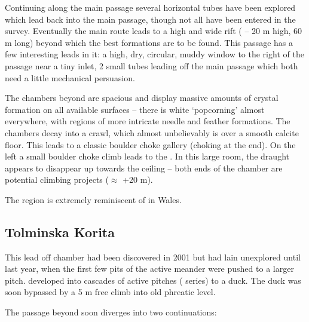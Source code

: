 Continuing along the main  passage several horizontal tubes have been explored which lead back into the main passage, though not all have
been entered in the survey. Eventually the main route leads to a high and wide rift ( -- 20 m high, 60 m long) beyond
which the best formations are to be found. This passage has a few interesting leads in it: a high, dry, circular, muddy window to the right of the passage near a tiny inlet, 2 small tubes leading off the main passage which both need a little mechanical persuasion.

The chambers beyond  are spacious and display massive amounts of crystal formation on all available surfaces -- there is
white `popcorning' almost everywhere, with regions of more intricate needle and feather formations. The chambers decay into a crawl, which almost unbelievably is over a smooth calcite floor. This leads to a classic boulder choke gallery (choking at the end). On the left a small boulder choke climb leads to the . In this large room, the draught appears to disappear up towards the ceiling -- both ends of
the chamber are potential climbing projects ($\approx$ +20 m).

The region is extremely reminiscent of  in Wales.


\subsection{Tolminska Korita}

This lead off  chamber had been discovered in 2001 but had lain unexplored until last year, when the first few pits of the active meander were pushed to a larger pitch.  developed into cascades of active pitches ( series) to a duck. The
duck was soon bypassed by a 5 m free climb into old phreatic level.

The passage beyond soon diverges into two continuations:



